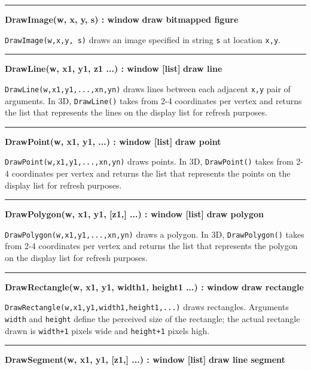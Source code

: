 \bigskip\hrule\vspace{0.1cm}
\noindent
{\bf DrawImage(w, x, y, s) : window } \hfill {\bf draw bitmapped figure}

\noindent
\texttt{DrawImage(w,x,y, s)} draws an image specified in string
\texttt{s} at location \texttt{x,y}.

\bigskip\hrule\vspace{0.1cm}
\noindent
{\bf DrawLine(w, x1, y1, z1 ...) : window [list] } \hfill {\bf draw line}

\noindent
\texttt{DrawLine(w,x1,y1,...,xn,yn)} draws lines between each adjacent
\texttt{x,y} pair of arguments. In 3D, \texttt{DrawLine()} takes from
2-4 coordinates per vertex and returns the list that represents the
lines on the display list for refresh purposes.

\bigskip\hrule\vspace{0.1cm}
\noindent
{\bf DrawPoint(w, x1, y1, ...) : window [list] } \hfill {\bf draw point}

\noindent
\texttt{DrawPoint(w,x1,y1,...,xn,yn)} draws points. In 3D,
\texttt{DrawPoint()} takes from 2-4 coordinates per vertex and returns
the list that represents the points on the display list for refresh
purposes.

\bigskip\hrule\vspace{0.1cm}
\noindent
{\bf DrawPolygon(w, x1, y1, [z1,] ...) : window [list] } \hfill {\bf draw polygon}

\noindent
\texttt{DrawPolygon(w,x1,y1,...,xn,yn)} draws a polygon. In 3D,
\texttt{DrawPolygon()} takes from 2-4 coordinates per vertex and returns the
list that represents the polygon on the display list for refresh
purposes.

\bigskip\hrule\vspace{0.1cm}
\noindent
{\bf DrawRectangle(w, x1, y1, width1, height1 ...) : window } \hfill {\bf draw rectangle}

\noindent
\texttt{DrawRectangle(w,x1,y1,width1,height1,...)} draws rectangles.
Arguments \texttt{width} and \texttt{height} define the perceived size
of the rectangle; the actual rectangle drawn is \texttt{width+1} pixels
wide and \texttt{height+1} pixels high.

\bigskip\hrule\vspace{0.1cm}
\noindent
{\bf DrawSegment(w, x1, y1, [z1,] ...) : window [list] } \hfill {\bf draw line segment}


